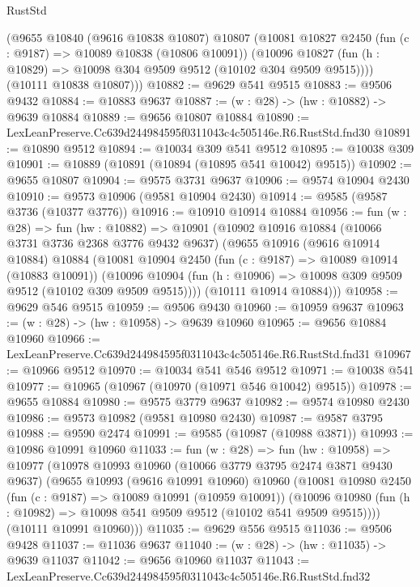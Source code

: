 \begin{lexlean}{RustStd}
\begin{coremodule}
      (@9655
        @10840
        (@9616 @10838 @10807)
        @10807
        (@10081
          @10827
          @2450
          (fun (c : @9187) => @10089 @10838 (@10806 @10091))
          (@10096 @10827 (fun (h : @10829) => @10098 @304 @9509 @9512 (@10102 @304 @9509 @9515))))
        (@10111 @10838 @10807)))
@10882 := @9629 @541 @9515
@10883 := @9506 @9432
@10884 := @10883 @9637
@10887 := (w : @28) -> (hw : @10882) -> @9639 @10884
@10889 := @9656 @10807 @10884
@10890 := LexLeanPreserve.Cc639d244984595f0311043c4c505146e.R6.RustStd.fnd30
@10891 := @10890 @9512
@10894 := @10034 @309 @541 @9512
@10895 := @10038 @309
@10901 := @10889 (@10891 (@10894 (@10895 @541 @10042) @9515))
@10902 := @9655 @10807
@10904 := @9575 @3731 @9637
@10906 := @9574 @10904 @2430
@10910 := @9573 @10906 (@9581 @10904 @2430)
@10914 := @9585 (@9587 @3736 (@10377 @3776))
@10916 := @10910 @10914 @10884
@10956 := fun (w : @28) =>
  fun (hw : @10882) =>
  @10901
    (@10902
      @10916
      @10884
      (@10066 @3731 @3736 @2368 @3776 @9432 @9637)
      (@9655
        @10916
        (@9616 @10914 @10884)
        @10884
        (@10081
          @10904
          @2450
          (fun (c : @9187) => @10089 @10914 (@10883 @10091))
          (@10096 @10904 (fun (h : @10906) => @10098 @309 @9509 @9512 (@10102 @309 @9509 @9515))))
        (@10111 @10914 @10884)))
@10958 := @9629 @546 @9515
@10959 := @9506 @9430
@10960 := @10959 @9637
@10963 := (w : @28) -> (hw : @10958) -> @9639 @10960
@10965 := @9656 @10884 @10960
@10966 := LexLeanPreserve.Cc639d244984595f0311043c4c505146e.R6.RustStd.fnd31
@10967 := @10966 @9512
@10970 := @10034 @541 @546 @9512
@10971 := @10038 @541
@10977 := @10965 (@10967 (@10970 (@10971 @546 @10042) @9515))
@10978 := @9655 @10884
@10980 := @9575 @3779 @9637
@10982 := @9574 @10980 @2430
@10986 := @9573 @10982 (@9581 @10980 @2430)
@10987 := @9587 @3795
@10988 := @9590 @2474
@10991 := @9585 (@10987 (@10988 @3871))
@10993 := @10986 @10991 @10960
@11033 := fun (w : @28) =>
  fun (hw : @10958) =>
  @10977
    (@10978
      @10993
      @10960
      (@10066 @3779 @3795 @2474 @3871 @9430 @9637)
      (@9655
        @10993
        (@9616 @10991 @10960)
        @10960
        (@10081
          @10980
          @2450
          (fun (c : @9187) => @10089 @10991 (@10959 @10091))
          (@10096 @10980 (fun (h : @10982) => @10098 @541 @9509 @9512 (@10102 @541 @9509 @9515))))
        (@10111 @10991 @10960)))
@11035 := @9629 @556 @9515
@11036 := @9506 @9428
@11037 := @11036 @9637
@11040 := (w : @28) -> (hw : @11035) -> @9639 @11037
@11042 := @9656 @10960 @11037
@11043 := LexLeanPreserve.Cc639d244984595f0311043c4c505146e.R6.RustStd.fnd32

\end{coremodule}
\end{lexlean}

